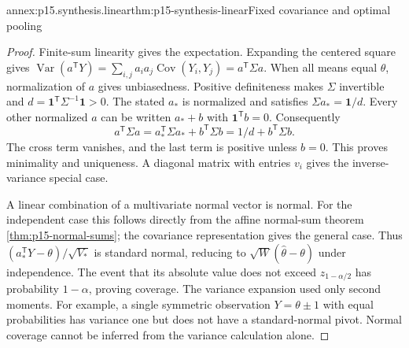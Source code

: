 \begin{annexitem}{annex:p15.synthesis.linear}{thm:p15-synthesis-linear}{Fixed covariance and optimal pooling}
\begin{proof}
Finite-sum linearity gives the expectation. Expanding the centered square
gives \(\operatorname{Var}(a^{\mathsf T}Y)=
\sum_{i,j}a_ia_j\operatorname{Cov}(Y_i,Y_j)=a^{\mathsf T}\Sigma a\).
When all means equal \(\theta\), normalization of \(a\) gives unbiasedness.
Positive definiteness makes \(\Sigma\) invertible and
\(d=\mathbf1^{\mathsf T}\Sigma^{-1}\mathbf1>0\).
The stated \(a_*\) is normalized and satisfies
\(\Sigma a_*=\mathbf1/d\). Every other normalized \(a\) can be
written \(a_*+b\) with \(\mathbf1^{\mathsf T}b=0\). Consequently
\[
 a^{\mathsf T}\Sigma a=a_*^{\mathsf T}\Sigma a_*
            +b^{\mathsf T}\Sigma b=1/d+b^{\mathsf T}\Sigma b.
\]
The cross term vanishes, and the last term is positive unless \(b=0\).
This proves minimality and uniqueness. A diagonal matrix with entries
\(v_i\) gives the inverse-variance special case.

A linear combination of a multivariate normal vector is normal. For the
independent case this follows directly from the affine normal-sum theorem
\ref{thm:p15-normal-sums}; the covariance representation gives the general
case. Thus \((a_*^{\mathsf T}Y-\theta)/\sqrt{V_*}\) is standard
normal, reducing to \(\sqrt W(\widehat\theta-\theta)\) under independence.
The event that its absolute value does not exceed \(z_{1-\alpha/2}\)
has probability \(1-\alpha\), proving coverage. The variance expansion
used only second moments. For example, a single symmetric observation
\(Y=\theta\pm1\) with equal probabilities has variance one but does not
have a standard-normal pivot. Normal coverage cannot be inferred from the
variance calculation alone.
\end{proof}
\end{annexitem}

